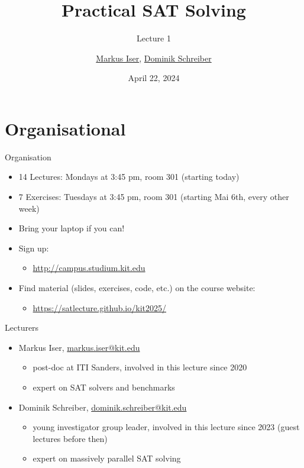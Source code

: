 \documentclass[t]{sdqbeamer}
\title[SAT Solving]{Practical SAT Solving}
\subtitle{Lecture 1}
\author{\underline{Markus Iser}, \underline{Dominik Schreiber}}
\date{April 22, 2024}
\begin{document}
\begin{frame}
	\thispagestyle{empty}
	\titlepage{}
\end{frame}

\section{Organisational}
\begin{frame}{Organisation}
	\begin{itemize}\setlength{\itemsep}{1em}
		\item 14 Lectures: Mondays at 3:45 pm, room 301 (starting today)
		\item 7 Exercises: Tuesdays at 3:45 pm, room 301 (starting Mai 6th, every other week)
		\item Bring your laptop if you can!
		\item Sign up:
		\begin{itemize}
			\item \url{http://campus.studium.kit.edu}
		\end{itemize}
		\item Find material (slides, exercises, code, etc.) on the course website:
		\begin{itemize}
			\item \url{https://satlecture.github.io/kit2025/}
		\end{itemize}
	\end{itemize}
\end{frame}

\begin{frame}{Lecturers}
\begin{itemize}\setlength{\itemsep}{1em}
	\item Markus Iser, \href{mailto:markus.iser@kit.edu}{markus.iser@kit.edu}
	\begin{itemize}
		\item post-doc at ITI Sanders, involved in this lecture since 2020
		\item expert on SAT solvers and benchmarks
	\end{itemize}
	\item Dominik Schreiber, \href{mailto:dominik.schreiber}{dominik.schreiber@kit.edu}
	\begin{itemize}
		\item young investigator group leader, involved in this lecture since 2023 (guest lectures before then)
		\item expert on massively parallel SAT solving
	\end{itemize}
\end{itemize}
\end{frame}
\end{document}
